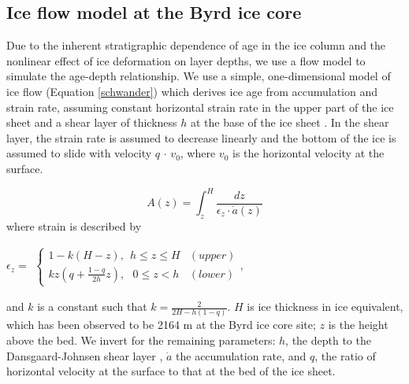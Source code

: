 \subsection{Ice flow model at the Byrd ice core}

Due to the inherent stratigraphic dependence of age in the ice column and the nonlinear effect of ice deformation on layer depths, we use a flow model to simulate the age-depth relationship. We use a simple, one-dimensional model of ice flow (Equation \ref{schwander}) which derives ice age from accumulation and strain rate, assuming constant horizontal strain rate in the upper part of the ice sheet and a shear layer of thickness $h$ at the base of the ice sheet \citep{schwander2001}. In the shear layer, the strain rate is assumed to decrease linearly and the bottom of the ice is assumed to slide with velocity $q$ $\cdot$ $v_0$, where $v_0$ is the horizontal velocity at the surface.

\begin{equation}\label{schwander}
A(z) = \int_{z}^{H} \frac{dz}{\epsilon_z \cdot \dot{a}(z)}
\end{equation}
where strain is described by
\begin{center}
$    \epsilon_z=
	\begin{aligned}
    \begin{cases}
                 1-k(H-z), \:\:  h \leq z \leq H  & (upper) \\
                  kz(q+\frac{1-q}{2h}z), \:\:\: 0 \leq z < h &(lower)
    \end{cases}, 
    \end{aligned}
$

\end{center}
and $k$ is a constant such that $k = \frac{2}{2H - h(1-q)}$. $H$ is ice thickness in ice equivalent, which has been observed to be 2164 m at the Byrd ice core site; $z$ is the height above the bed. We invert for the remaining parameters: $h$, the depth to the Dansgaard-Johnsen shear layer \citep{dansgaardjohnsen1969}, $\dot{a}$ the accumulation rate, and $q$, the ratio of horizontal velocity at the surface to that at the bed of the ice sheet.

